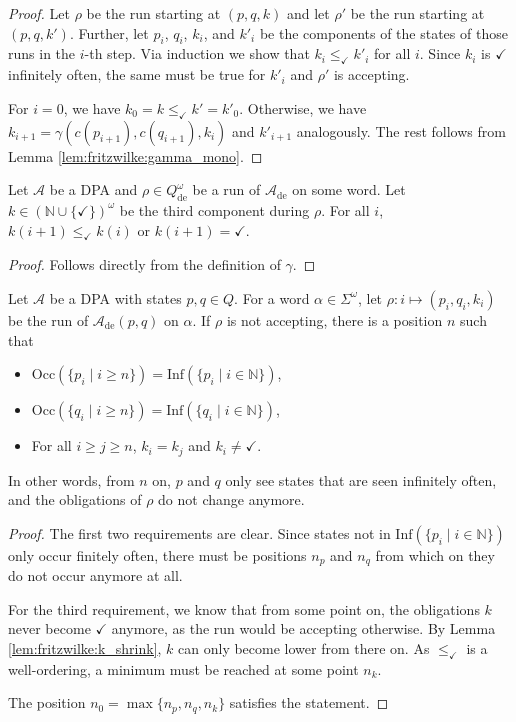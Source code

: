 \begin{proof}
	Let $\rho$ be the run starting at $(p, q, k)$ and let $\rho'$ be the run starting at $(p, q, k')$. Further, let $p_i$, $q_i$, $k_i$, and $k'_i$ be the components of the states of those runs in the $i$-th step. Via induction we show that $k_i \leq_\checkmark k'_i$ for all $i$. Since $k_i$ is $\checkmark$ infinitely often, the same must be true for $k'_i$ and $\rho'$ is accepting.
	
	For $i = 0$, we have $k_0 = k \leq_\checkmark k' = k'_0$. Otherwise, we have $k_{i+1} = \gamma(c(p_{i+1}), c(q_{i+1}), k_i)$ and $k'_{i+1}$ analogously. The rest follows from Lemma \ref{lem:fritzwilke:gamma_mono}.
\end{proof}

\begin{lem}
\label{lem:fritzwilke:k_shrink}
	Let $\mathcal{A}$ be a DPA and $\rho \in Q_\text{de}^\omega$ be a run of $\mathcal{A}_\text{de}$ on some word. Let $k \in (\mathbb{N} \cup \{\checkmark\})^\omega$ be the third component during $\rho$. For all $i$, $k(i+1) \leq_\checkmark k(i)$ or $k(i+1) = \checkmark$.
\end{lem}

\begin{proof}
	Follows directly from the definition of $\gamma$.
\end{proof}

\begin{lem}
\label{lem:fritzwilke:n0_exists}
	Let $\mathcal{A}$ be a DPA with states $p, q \in Q$. For a word $\alpha \in \Sigma^\omega$, let $\rho : i \mapsto (p_i, q_i, k_i)$ be the run of $\mathcal{A}_\text{de}(p, q)$ on $\alpha$. If $\rho$ is not accepting, there is a position $n$ such that
	\begin{itemize}
		\item $\text{Occ}(\{p_i \mid i \geq n\}) = \text{Inf}(\{p_i \mid i \in \mathbb{N}\})$,
		\item $\text{Occ}(\{q_i \mid i \geq n\}) = \text{Inf}(\{q_i \mid i \in \mathbb{N}\})$,
		\item For all $i \geq j \geq n$, $k_i = k_j$ and $k_i \neq \checkmark$.
	\end{itemize}
	
	In other words, from $n$ on, $p$ and $q$ only see states that are seen infinitely often, and the obligations of $\rho$ do not change anymore.
\end{lem}

\begin{proof}
	The first two requirements are clear. Since states not in $\text{Inf}(\{p_i \mid i \in \mathbb{N}\})$ only occur finitely often, there must be positions $n_p$ and $n_q$ from which on they do not occur anymore at all.
	
	For the third requirement, we know that from some point on, the obligations $k$ never become $\checkmark$ anymore, as the run would be accepting otherwise. By Lemma \ref{lem:fritzwilke:k_shrink}, $k$ can only become lower from there on. As $\leq_\checkmark$ is a well-ordering, a minimum must be reached at some point $n_k$.
	
	The position $n_0 = \max \{n_p, n_q, n_k\}$ satisfies the statement.
\end{proof}


